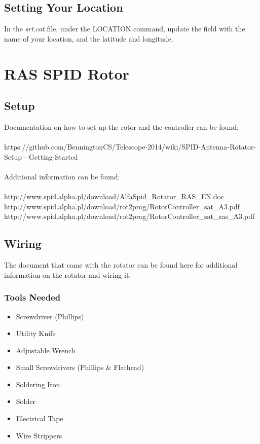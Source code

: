 \documentclass[11pt]{article} %
\begin{document}
\subsection{Setting Your Location}

In the \emph{srt.cat} file, under the LOCATION command, update the field with the name of your location, and the latitude and longitude. 






\newpage
\section{RAS SPID Rotor}

\subsection{Setup}

Documentation on how to set up the rotor and the controller can be found: \\ \\
https://github.com/BenningtonCS/Telescope-2014/wiki/SPID-Antenna-Rotator-Setup---Getting-Started
\\ \\
Additional information can be found: \\ \\
http://www.spid.alpha.pl/download/AlfaSpid\_Rotator\_RAS\_EN.doc \\
http://www.spid.alpha.pl/download/rot2prog/RotorController\_sat\_A3.pdf \\
http://www.spid.alpha.pl/download/rot2prog/RotorController\_sat\_zas\_A3.pdf \\




\subsection{Wiring}


The document that came with the rotator can be found here for additional information on the rotator and wiring it.

\subsubsection{Tools Needed}
\begin{multicols}{2}
\begin{itemize}
\item Screwdriver (Phillips)
\item Utility Knife
\item Adjustable Wrench
\item Small Screwdrivers (Phillips \& Flathead)
\item Soldering Iron
\item Solder
\item Electrical Tape
\item Wire Strippers
\end{itemize}
\end{multicols}
\end{document}
